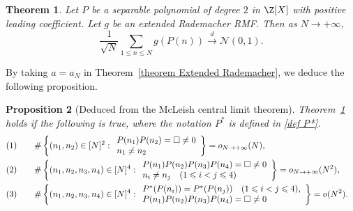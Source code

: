 \documentclass[reqno, 12pt]{amsart}
\theoremstyle{plain}
\newtheorem{theorem}{Theorem}[section]
\newtheorem{proposition}[theorem]{Proposition}
\theoremstyle{definition}
\theoremstyle{remark}
\renewcommand{\leq}{\leqslant}
\begin{document}
\begin{theorem}\label{thm: CLT}
   Let $P$ be a separable polynomial of degree $2$ in $\Z[X]$ with positive leading coefficient. Let $g$ be an extended Rademacher RMF. Then as $N\to +\infty$,
  \begin{equation}
      \label{eq CLT}
  \frac{1}{\sqrt{N}} \sum_{1\leq n \leq N} g(P(n)) \xrightarrow{d} \mathcal{N}(0,1).
  \end{equation}
\end{theorem}
 By taking $a=a_N$ in Theorem~\ref{theorem Extended Rademacher}, we deduce the following proposition.

\begin{proposition}[Deduced from the McLeish central limit theorem]\label{prop: mcleish}
Theorem~\ref{thm: CLT} holds if the following is true,
where the notation $P^*$ is defined in \eqref{def P*}.
\begin{align*}
&  (1)\qquad\#\left\{( n_1, n_2 )\in [N]^{2}: \begin{array}{l}P(n_1)P(n_2)  = \square \neq 0\cr n_1\neq n_2 \end{array}  \right\} = o_{N\to +\infty}(N ), \cr
  &  (2)\qquad\#\left\{( n_1, n_2, n_3, n_4)\in [N]^{4}: \begin{array}{l}P(n_1)P(n_2) P(n_3)P(n_4)= \square \neq 0\cr n_i\neq n_j\quad (1\leq i<j\leq 4)\end{array}  \right\} = o_{N\to +\infty}(N^{2}), \cr
   & (3) \qquad
\# \left\{ ( n_1, n_2, n_3, n_4) \in [N]^{4}:  \begin{array}{l}
 P^{*}(P(n_i)) = P^{*}(P(n_j)) \quad (1\leq i<j\leq 4),\\   P(n_1)P(n_2) P(n_3)P(n_4)   =\square \neq 0\end{array}\right\} =o(N^{2}).     
\end{align*}
\end{proposition}
\end{document}
